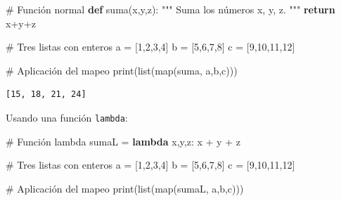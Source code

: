 \documentclass[
  spanish,
  letterpaper,
]{scrbook}
\newenvironment{Shaded}{\begin{snugshade}}{\end{snugshade}}
\newcommand{\BuiltInTok}[1]{\textcolor[rgb]{0.00,0.23,0.31}{#1}}
\newcommand{\CommentTok}[1]{\textcolor[rgb]{0.37,0.37,0.37}{#1}}
\newcommand{\ControlFlowTok}[1]{\textcolor[rgb]{0.00,0.23,0.31}{\textbf{#1}}}
\newcommand{\DecValTok}[1]{\textcolor[rgb]{0.68,0.00,0.00}{#1}}
\newcommand{\KeywordTok}[1]{\textcolor[rgb]{0.00,0.23,0.31}{\textbf{#1}}}
\newcommand{\NormalTok}[1]{\textcolor[rgb]{0.00,0.23,0.31}{#1}}
\newcommand{\OperatorTok}[1]{\textcolor[rgb]{0.37,0.37,0.37}{#1}}
\theoremstyle{definition}
\theoremstyle{remark}
\begin{document}
\begin{Shaded}
\begin{Highlighting}[]
\CommentTok{\# Función normal}
\KeywordTok{def}\NormalTok{ suma(x,y,z):}
    \CommentTok{"""}
\CommentTok{    Suma los números x, y, z.}
\CommentTok{    """}
    \ControlFlowTok{return}\NormalTok{ x}\OperatorTok{+}\NormalTok{y}\OperatorTok{+}\NormalTok{z}

\CommentTok{\# Tres listas con enteros}
\NormalTok{a }\OperatorTok{=}\NormalTok{ [}\DecValTok{1}\NormalTok{,}\DecValTok{2}\NormalTok{,}\DecValTok{3}\NormalTok{,}\DecValTok{4}\NormalTok{]}
\NormalTok{b }\OperatorTok{=}\NormalTok{ [}\DecValTok{5}\NormalTok{,}\DecValTok{6}\NormalTok{,}\DecValTok{7}\NormalTok{,}\DecValTok{8}\NormalTok{]}
\NormalTok{c }\OperatorTok{=}\NormalTok{ [}\DecValTok{9}\NormalTok{,}\DecValTok{10}\NormalTok{,}\DecValTok{11}\NormalTok{,}\DecValTok{12}\NormalTok{]}

\CommentTok{\# Aplicación del mapeo}
\BuiltInTok{print}\NormalTok{(}\BuiltInTok{list}\NormalTok{(}\BuiltInTok{map}\NormalTok{(suma, a,b,c)))}
\end{Highlighting}
\end{Shaded}

\begin{verbatim}
[15, 18, 21, 24]
\end{verbatim}

Usando una función \texttt{lambda}:

\begin{Shaded}
\begin{Highlighting}[]
\CommentTok{\# Función lambda}
\NormalTok{sumaL }\OperatorTok{=} \KeywordTok{lambda}\NormalTok{ x,y,z: x }\OperatorTok{+}\NormalTok{ y }\OperatorTok{+}\NormalTok{ z}

\CommentTok{\# Tres listas con enteros}
\NormalTok{a }\OperatorTok{=}\NormalTok{ [}\DecValTok{1}\NormalTok{,}\DecValTok{2}\NormalTok{,}\DecValTok{3}\NormalTok{,}\DecValTok{4}\NormalTok{]}
\NormalTok{b }\OperatorTok{=}\NormalTok{ [}\DecValTok{5}\NormalTok{,}\DecValTok{6}\NormalTok{,}\DecValTok{7}\NormalTok{,}\DecValTok{8}\NormalTok{]}
\NormalTok{c }\OperatorTok{=}\NormalTok{ [}\DecValTok{9}\NormalTok{,}\DecValTok{10}\NormalTok{,}\DecValTok{11}\NormalTok{,}\DecValTok{12}\NormalTok{]}

\CommentTok{\# Aplicación del mapeo}
\BuiltInTok{print}\NormalTok{(}\BuiltInTok{list}\NormalTok{(}\BuiltInTok{map}\NormalTok{(sumaL, a,b,c)))}
\end{Highlighting}
\end{Shaded}
\end{document}
